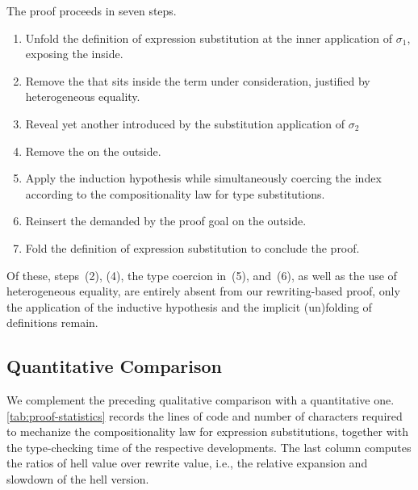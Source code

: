 \documentclass[manuscript,screen,review,anonymous,acmsmall]{acmart}
\begin{document}
\noindent The proof proceeds in seven steps.
\begin{enumerate}
  \item Unfold the definition of expression substitution at the inner
        application of $\sigma_1$, exposing the 
        inside.
  \item Remove the  that sits inside the term under
        consideration, justified by heterogeneous equality.
  \item Reveal yet another  introduced by the substitution application of $\sigma_2$
  \item Remove the  on the outside.
  \item Apply the induction hypothesis while simultaneously coercing
        the index according to the compositionality law for type
        substitutions.
  \item Reinsert the  demanded by the proof goal on
        the outside.
  \item Fold the definition of expression substitution to conclude the
        proof.
\end{enumerate}
Of these, steps~(2), (4), the type coercion in~(5), and~(6),
as well as the use of heterogeneous equality, are entirely
absent from our rewriting-based proof, only the application of the
inductive hypothesis and the implicit (un)folding of definitions remain.

\subsection{Quantitative Comparison}
\label{sec:quant-comp}

We complement the preceding qualitative comparison with a quantitative
one. \cref{tab:proof-statistics} records the lines of code and number
of characters 
required to mechanize the compositionality law for expression
substitutions, together with the type-checking time of the
respective developments. The last column computes the ratios of hell
value over rewrite value, i.e., the relative expansion and slowdown of
the hell version.
\end{document}
